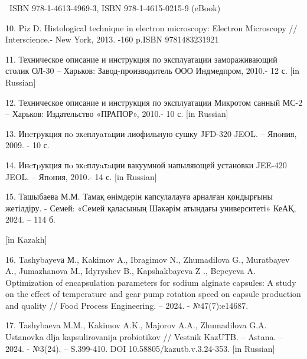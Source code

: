 \begin{references}
~ISBN 978-1-4613-4969-3, ISBN 978-1-4615-0215-9 (eBook)

10. Piz D. Histological technique in electron microscopy: Electron
Microscopy // Interscience.- New York, 2013. -160 p.ISBN 9781483231921

11. Техническое описание и инструкция по эксплуатации замораживающий
столик ОЛ-30 -- Харьков: Завод-производитель ООО Индмедпром, 2010.- 12
с. {[}in Russian{]}

12. Техническое описание и инструкция по эксплуатации Микротом санный
МС-2 -- Харьков: Издательство «ПРАПОР», 2010.- 10 с. {[}in Russian{]}

13. Инcтpукция пo экcплуaтaции лиофильную сушку JFD-320 JEOL. -- Япoния,
2009. - 10 с.

14. Инcтpукция пo экcплуaтaции вакуумной напыляющей установки JEE-420
JEOL. -- Япoния, 2010.- 14 с. {[}in Russian{]}

15. Ташыбаева М.М. Тамақ өнімдерін капсулалауға арналған қондырғыны
жетілдіру. - Семей: «Семей қаласының Шәкәрім атындағы университеті»
КеАҚ, 2024. -- 114 б.
\href{https://shakarim.edu.kz/upload/editor/pages/science/dissertation/Tashybaeva/kaz-1.pdf}{}

{[}in Kazakh{]}

16. Tashybayevа М., Kakimov A., Ibragimov N., Zhumadilova G., Muratbayev
A., Jumazhanova M., Idyryshev B., Kapshakbayeva Z ., Bepeyeva A.
Optimization of encapsulation parameters for sodium alginate capsules: A
study on the effect of temperature and gear pump rotation speed on
capsule production and quality // Food Process Engineering. -- 2024. -
№47(7):e14687. 

17. Tashybaeva M.M., Kakimov A.K., Majorov A.A., Zhumadilova G.A.
Ustanovka dlja kapsulirovanija probiotikov // Vestnik KazUTB. -- Astana.
-- 2024. - №3(24). -- S.399-410. DOI 10.58805/kazutb.v.3.24-353. {[}in
Russian{]}
\end{references}

